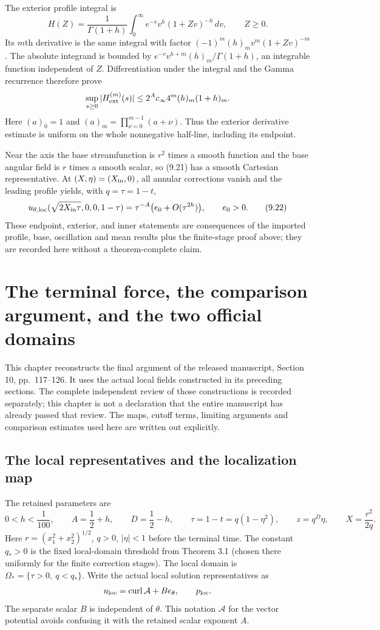 \documentclass[10pt,a4paper]{article}
\begin{document}
The exterior profile integral is
\[
H(Z)=\frac1{\Gamma(1+h)}\int_0^\infty
e^{-v}v^h(1+Zv)^{-h}\,dv,\qquad Z\ge0 .
\]
Its $m$th derivative is the same integral with factor
$(-1)^m(h)_m v^m(1+Zv)^{-m}$. The absolute integrand is bounded
by $e^{-v}v^{h+m}(h)_m/\Gamma(1+h)$, an integrable function
independent of $Z$. Differentiation under the integral and the Gamma
recurrence therefore prove
\[
\sup_{s\ge0}|H_{\rm ext}^{(m)}(s)|
\le2^A c_\infty4^m(h)_m(1+h)_m .
\]
Here $(a)_0=1$ and $(a)_m=\prod_{\nu=0}^{m-1}(a+\nu)$.
Thus the exterior derivative estimate is uniform on the whole
nonnegative half-line, including its endpoint.

Near the axis the
base streamfunction is $r^2$ times a smooth function and the base angular field
is $r$ times a smooth scalar, so (9.21) has a smooth Cartesian representative.
At $(X,\eta)=(X_{\rm in},0)$, all annular corrections vanish and the leading
profile yields, with $q=\tau=1-t$,
\[
 u_{\theta,\rm loc}(\sqrt{2X_{\rm in}\tau},0,0,1-\tau)
 =\tau^{-A}\big(e_0+O(\tau^{2h})\big),\qquad e_0>0 .              \tag{9.22}
\]
These endpoint, exterior, and inner statements are consequences of the imported
profile, base, oscillation and mean results plus the finite-stage proof above; they
are recorded here without a theorem-complete claim.





\section{The terminal force, the comparison argument, and the two official domains}
\label{sec:released-endpoint}

This chapter reconstructs the final argument of the released manuscript,
Section 10, pp.~117--126. It uses the actual local fields constructed in its
preceding sections. The complete independent review of those constructions
is recorded separately; this chapter is not a declaration that the entire
manuscript has already passed that review. The maps, cutoff terms, limiting
arguments and comparison estimates used here are written out explicitly.

\subsection{The local representatives and the localization map}

The retained parameters are
\[
 0<h<\frac1{100},\qquad A=\frac12+h,\qquad D=\frac12-h,\qquad
 \tau=1-t=q(1-\eta^2),\qquad z=q^D\eta,\qquad X=\frac{r^2}{2q}.
\]
Here $r=(x_1^2+x_2^2)^{1/2}$, $q>0$, $|\eta|<1$ before the
terminal time. The constant $q_*>0$ is the fixed local-domain threshold
from Theorem 3.1 (chosen there uniformly for the finite correction stages).
The local domain is $\Omega_*=\{\tau>0,\ q<q_*\}$.
Write the actual local solution representatives as
\[
 u_{\rm loc}=\operatorname{curl}\mathcal A+B e_\theta,\qquad p_{\rm loc}.
\]
The separate scalar $B$ is independent of $\theta$. This notation
$\mathcal A$ for the vector potential avoids confusing it with the
retained scalar exponent $A$.
\end{document}
